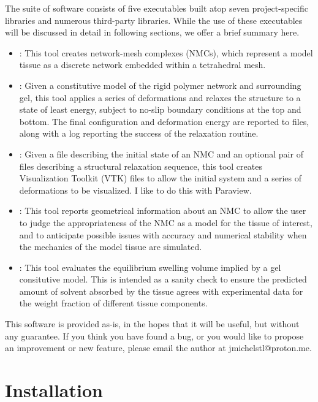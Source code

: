 \documentclass{article}
\begin{document}
The suite of software consists of five executables built atop
seven project-specific libraries and numerous third-party libraries. While
the use of these executables will be discussed in detail in following sections,
we offer a brief summary here.

\begin{itemize}
\item[\textbf{nmcbatch}]: This tool creates network-mesh complexes (NMCs), which represent a model tissue as a discrete network embedded within a tetrahedral mesh.
\item[\textbf{ngrelex}]: Given a constitutive model of the rigid polymer network and surrounding gel, this tool applies a series of deformations and relaxes the structure to a state of least energy, subject to no-slip boundary conditions at the top and bottom. The final configuration and deformation energy are reported to files, along with a log reporting the success of the relaxation routine.
\item[\textbf{nmtraj\_viz}]: Given a file describing the initial state of an NMC and an optional pair of files describing a structural relaxation sequence, this tool creates Visualization Toolkit (VTK) files to allow the initial system and a series of deformations to be visualized. I like to do this with Paraview.
\item[\textbf{nmc\_stats}]: This tool reports geometrical information about an NMC to allow the user to judge the appropriateness of the NMC as a model for the tissue of interest, and to anticipate possible issues with accuracy and numerical stability when the mechanics of the model tissue are simulated.
\item[\textbf{eq}]: This tool evaluates the equilibrium swelling volume implied by a gel consitutive model. This is intended as a sanity check to ensure the predicted amount of solvent absorbed by the tissue agrees with experimental data for the weight fraction of different tissue components.
\end{itemize}

This software is provided as-is, in the hopes that it will be useful, but
without any guarantee. If you think you have found a bug, or you would like
to propose an improvement or new feature, please email the author at
\mbox{jmichelstl@proton.me}.

\section{Installation}
\end{document}

